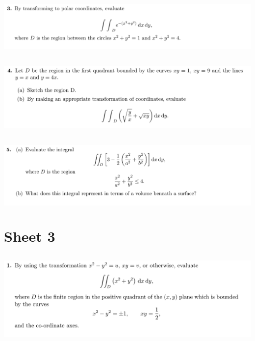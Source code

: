\documentclass[12pt]{article}
\begin{document}
\subsection{}
\begin{mdframed}
  \includegraphics[width=400pt]{img/oxford-prelims-M5-multivariable-calc-2-3.png}
\end{mdframed}

\subsection{}
\begin{mdframed}
  \includegraphics[width=400pt]{img/oxford-prelims-M5-multivariable-calc-2-4.png}
\end{mdframed}

\subsection{}
\begin{mdframed}
  \includegraphics[width=400pt]{img/oxford-prelims-M5-multivariable-calc-2-5.png}
\end{mdframed}



\newpage
\section{Sheet 3}


\subsection{}
\begin{mdframed}
  \includegraphics[width=400pt]{img/oxford-prelims-M5-multivariable-calc-3-1.png}
\end{mdframed}
\end{document}
